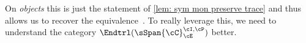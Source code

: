 On \emph{objects} this is just the statement of \cref{lem: sym mon preserve trace} and thus allows us to recover the
equivalence~.
To really leverage this, we need to understand the category 
$\Endtrl (\sSpan{\cC}_{\cE}^{\cI,\cP})$ better.


